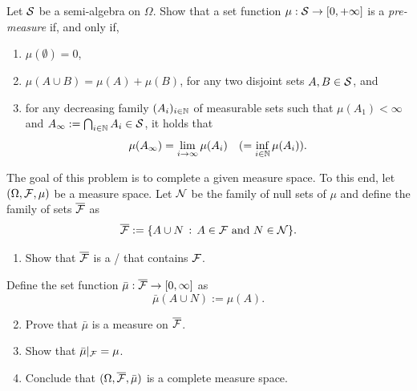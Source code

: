 \begin{problem}\label{prb:alternative_def_premeasure}
Let $\mathcal S$ be a semi-algebra on $\Omega$. Show that a set function $\mu : \mathcal S \to [0,+\infty]$ is a \emph{pre-measure} if, and only if,
\begin{enumerate}
\item $\mu(\emptyset) = 0$,
\item $\mu(A \cup B) = \mu(A) + \mu(B)$, for any two disjoint sets $A, B \in \mathcal S$, and
\item for any decreasing family $(A_i)_{i \in \mathbb N}$ of measurable sets such that $\mu(A_1) < \infty$ and $A_\infty := \bigcap_{i \in \mathbb N} A_i \in \mathcal S$, it holds that
\[
	\mu(A_\infty) = \lim_{i \to \infty} \mu(A_i) \quad (= \inf_{i \in \mathbb N} \mu(A_i)).
\]
\end{enumerate}
\end{problem}

\begin{problem}\label{prb:completion_measure_space}
The goal of this problem is to complete a given measure space. To this end, let $(\Omega, \mathcal F, \mu)$ be a measure space. Let $\mathcal N$ be the family of null sets of $\mu$ and define the family of sets $\overline{\mathcal F}$ as
\[
	\overline{\mathcal F} := \{A \cup N \, : \, A \in \mathcal F \text{ and } N \in \mathcal N\}.
\]
\begin{enumerate}[label=(\alph*)]
\item Show that $\overline{\mathcal F}$ is a \sigalg/ that contains $\mathcal F$.
\end{enumerate}
Define the set function $\bar{\mu} : \overline{\mathcal F} \to [0,\infty]$ as
\[
	\bar{\mu}(A \cup N) := \mu(A).
\]
\begin{enumerate}[label=(\alph*)]
\setcounter{enumi}{1}
\item Prove that $\bar{\mu}$ is a measure on $\overline{\mathcal F}$.
\item Show that $\bar{\mu}|_{\mathcal F} = \mu$.
\item Conclude that $(\Omega, \overline{\mathcal F}, \bar{\mu})$ is a complete measure space.
\end{enumerate}
\end{problem}




